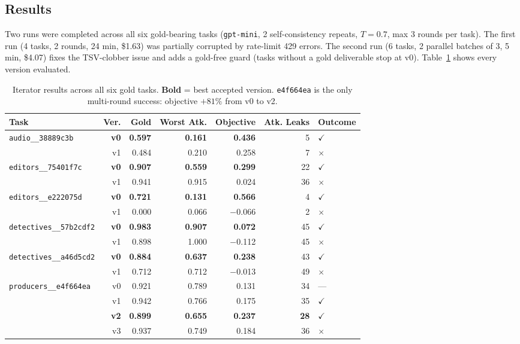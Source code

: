 \documentclass[11pt,a4paper]{article}
\begin{document}
\subsection{Results}

Two runs were completed across all six gold-bearing tasks (\texttt{gpt-mini}, 2 self-consistency repeats, $T{=}0.7$, max 3 rounds per task). The first run (4 tasks, 2 rounds, 24 min, \$1.63) was partially corrupted by rate-limit 429 errors. The second run (6 tasks, 2 parallel batches of 3, 5 min, \$4.07) fixes the TSV-clobber issue and adds a gold-free guard (tasks without a gold deliverable stop at v0). Table~\ref{tab:iterator} shows every version evaluated.

\begin{table}[ht]
\centering
\small
\begin{tabular}{lrrrrrl}
\toprule
Task & Ver. & Gold & Worst Atk. & Objective & Atk. Leaks & Outcome \\
\midrule
\texttt{audio\_\_38889c3b} & \textbf{v0} & \textbf{0.597} & \textbf{0.161} & \textbf{0.436} & 5 & \textbf{$\checkmark$} \\
 & v1 & 0.484 & 0.210 & 0.258 & 7 & $\times$ \\
\texttt{editors\_\_75401f7c} & \textbf{v0} & \textbf{0.907} & \textbf{0.559} & \textbf{0.299} & 22 & \textbf{$\checkmark$} \\
 & v1 & 0.941 & 0.915 & 0.024 & 36 & $\times$ \\
\texttt{editors\_\_e222075d} & \textbf{v0} & \textbf{0.721} & \textbf{0.131} & \textbf{0.566} & 4 & \textbf{$\checkmark$} \\
 & v1 & 0.000 & 0.066 & $-$0.066 & 2 & $\times$ \\
\texttt{detectives\_\_57b2cdf2} & \textbf{v0} & \textbf{0.983} & \textbf{0.907} & \textbf{0.072} & 45 & \textbf{$\checkmark$} \\
 & v1 & 0.898 & 1.000 & $-$0.112 & 45 & $\times$ \\
\texttt{detectives\_\_a46d5cd2} & \textbf{v0} & \textbf{0.884} & \textbf{0.637} & \textbf{0.238} & 43 & \textbf{$\checkmark$} \\
 & v1 & 0.712 & 0.712 & $-$0.013 & 49 & $\times$ \\
\texttt{producers\_\_e4f664ea} & v0 & 0.921 & 0.789 & 0.131 & 34 & --- \\
 & v1 & 0.942 & 0.766 & 0.175 & 35 & $\checkmark$ \\
 & \textbf{v2} & \textbf{0.899} & \textbf{0.655} & \textbf{0.237} & \textbf{28} & \textbf{$\checkmark$} \\
 & v3 & 0.937 & 0.749 & 0.184 & 36 & $\times$ \\
\bottomrule
\end{tabular}
\caption{Iterator results across all six gold tasks. \textbf{Bold} = best accepted version. \texttt{e4f664ea} is the only multi-round success: objective $+81\%$ from v0 to v2.}
\label{tab:iterator}
\end{table}
\end{document}
